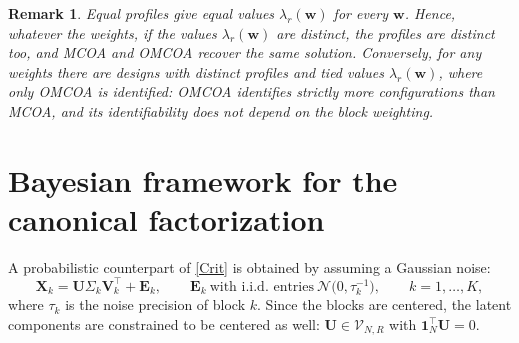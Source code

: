 \documentclass[11pt]{article}
\newtheorem{remark}{Remark}
\newcommand{\X}{\mathbf{X}}
\newcommand{\U}{\mathbf{U}}
\newcommand{\V}{\mathbf{V}}
\newcommand{\EE}{\mathbf{E}}
\newcommand{\one}{\mathbf{1}}
\newcommand{\Stiefel}[2]{\mathcal V_{#1,#2}}
\begin{document}
\begin{remark}
Equal profiles give equal values $\lambda_r(\mathbf w)$ for every $\mathbf w$. Hence, whatever the weights, if the values $\lambda_r(\mathbf w)$ are distinct, the profiles are distinct too, and MCOA and OMCOA recover the same solution. Conversely, for any weights there are designs with distinct profiles and tied values $\lambda_r(\mathbf w)$, where only OMCOA is identified: OMCOA identifies strictly more configurations than MCOA, and its identifiability does not depend on the block weighting.
\end{remark}


\section{Bayesian framework for the canonical factorization}

A probabilistic counterpart of \eqref{Crit} is obtained by assuming a Gaussian noise:
\begin{equation}
  \X_k=\U\Sigma_k\V_k^\intercal+\EE_k,\qquad
  \EE_k\ \text{with i.i.d. entries}\ \mathcal N\bigl(0,\tau_k^{-1}\bigr),\qquad k=1,\ldots,K,
  \label{eq:model}
\end{equation}
where $\tau_k$ is the noise precision of block $k$. Since the blocks are centered, the latent components are constrained to be
centered as well: $\U\in\Stiefel{N}{R}$ with $\one_N^\intercal\U=0$.
\end{document}
